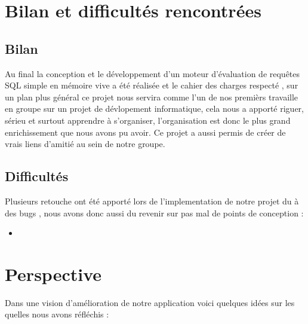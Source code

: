 \documentclass[oneside,13pt,a4paper]{report}
\begin{document}

\chapter{Bilan et difficultés rencontrées}
\section{Bilan}

Au final la conception et le développement d'un moteur d'évaluation de requêtes SQL simple en mémoire vive a été réalisée et le cahier des charges respecté , sur un plan plus général ce projet nous servira comme l'un de nos premièrs travaille en groupe sur un projet de dévlopement informatique, cela nous a apporté riguer, sérieu et surtout apprendre à s'organiser, l'organisation est donc le plus grand enrichissement que nous avons pu avoir.
\newline Ce projet a aussi permis de créer de vrais liens d'amitié au sein de notre groupe.

\section{Difficultés}

Plusieurs retouche ont été apporté lors de l'implementation de notre projet du à des bugs , nous avons donc aussi du revenir sur pas mal de points de conception :
\begin{itemize}
	\item
\end{itemize}

\chapter{Perspective}

Dans une vision d'amélioration de notre application voici quelques idées sur les quelles nous avons réfléchis :
\end{document}
